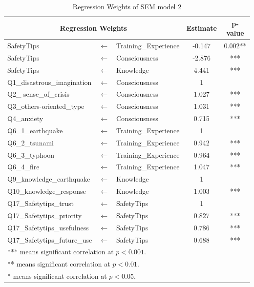 \begin{table}[t]
  \caption{Regression Weights of SEM model 2 }
  \label{table11}
  \centering
  \begin{tabular}{lcl|c|c}
 \hline
 \multicolumn{3}{c|}{Regression Weights} & Estimate & p-value \\
 \hline
SafetyTips              &$\longleftarrow$ & Training\_Experience & -0.147 & 0.002**                \\
SafetyTips              &$\longleftarrow$ & Consciousness        & -2.876 & ***                  \\
SafetyTips              &$\longleftarrow$ & Knowledge            & 4.441  & ***                  \\
Q1\_disastrous\_imagination                      &$\longleftarrow$ & Consciousness        & 1      &  \\
Q2\_ sense\_of\_crisis                      &$\longleftarrow$ & Consciousness        & 1.027  & ***                  \\
Q3\_others-oriented\_type                      &$\longleftarrow$ & Consciousness        & 1.031  & ***                  \\
Q4\_anxiety                      &$\longleftarrow$ & Consciousness        & 0.715  & ***                  \\
Q6\_1\_earthquake       &$\longleftarrow$ & Training\_Experience & 1      &  \\
Q6\_2\_tsunami          &$\longleftarrow$ & Training\_Experience & 0.942  & ***                  \\
Q6\_3\_typhoon          &$\longleftarrow$ & Training\_Experience & 0.964  & ***                  \\
Q6\_4\_fire             &$\longleftarrow$ & Training\_Experience & 1.047  & ***                  \\
Q9\_knowledge\_earthquake                      &$\longleftarrow$ & Knowledge            & 1      &  \\
Q10\_knowledge\_response                     &$\longleftarrow$ & Knowledge            & 1.003  & ***                  \\
Q17\_Safetytips\_trust &$\longleftarrow$ & SafetyTips           & 1      &  \\
Q17\_Safetytips\_priority &$\longleftarrow$ & SafetyTips           & 0.827  & ***                  \\
Q17\_Safetytips\_usefulness &$\longleftarrow$ & SafetyTips           & 0.786  & ***                  \\
Q17\_Safetytips\_future\_use &$\longleftarrow$ & SafetyTips           & 0.688  & ***                 \\
 \hline
\multicolumn{5}{l}{*** means significant correlation at $p<0.001$.} \\
\multicolumn{5}{l}{** means significant correlation at $p<0.01$.} \\
\multicolumn{5}{l}{* means significant correlation at $p<0.05$.} \\
  \end{tabular}
\end{table}

